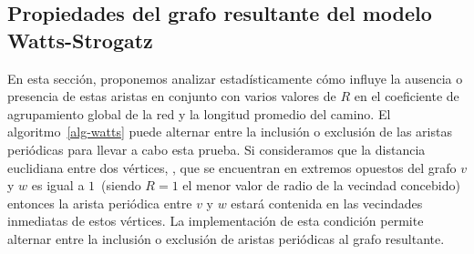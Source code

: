 \subsection{Propiedades del grafo resultante del modelo Watts-Strogatz}
\label{subsec-R-periodic}
En esta sección, proponemos analizar estadísticamente cómo influye la ausencia o presencia de estas aristas en conjunto con varios valores de $R$ en el coeficiente de agrupamiento global de la red y la longitud promedio del camino. El algoritmo~\ref{alg-watts} puede alternar entre la inclusión o exclusión de las aristas periódicas para llevar a cabo esta prueba. Si consideramos que la distancia euclidiana entre dos vértices, 
, que se encuentran en extremos opuestos del grafo $v$ y $w$ es igual a $1$~(siendo $R=1$ el menor valor de radio de la vecindad concebido) entonces la arista peri\'odica entre $v$ y $w$ estar\'a contenida en las vecindades inmediatas de estos v\'ertices. La implementación de esta condición permite alternar entre la inclusión o exclusión de aristas periódicas al grafo resultante.

